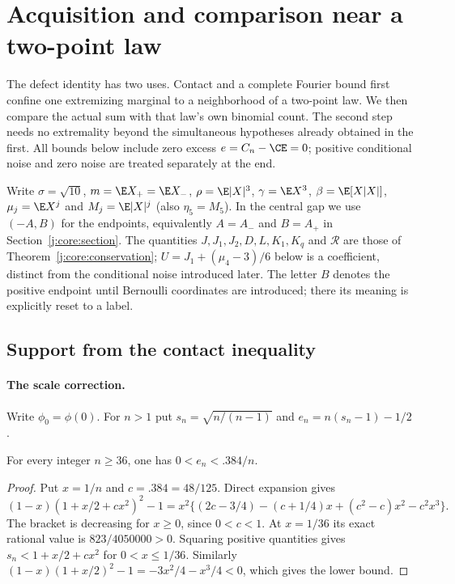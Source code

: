 \providecommand{\phio}{\phi(0)}
\providecommand{\cR}{\mathcal R}
\providecommand{\Prb}{\mathbb P}
\providecommand{\nm}{\mathrm}
\section{Acquisition and comparison near a two-point law}
\label{j:local:section}
The defect identity has two uses. Contact and a complete Fourier bound
first confine one extremizing marginal to a neighborhood of a two-point
law. We then compare the actual sum with that law's own binomial count.
The second step needs no extremality beyond the simultaneous hypotheses
already obtained in the first. All bounds below include zero excess
$e=C_n-\CE=0$; positive conditional noise and zero noise are treated
separately at the end.

Write $\sigma=\sqrt{10}$, $m=\E X_+=\E X_-$,
$\rho=\E|X|^3$, $\gamma=\E X^3$, $\beta=\E[X|X|]$,
$\mu_j=\E X^j$ and $M_j=\E|X|^j$ (also $\eta_5=M_5$).
In the central gap we use $(-A,B)$ for the endpoints, equivalently
$A=A_-$ and $B=A_+$ in Section~\ref{j:core:section}.
The quantities $J,J_1,J_2,D,L,K_1,K_q$ and $\mathcal R$ are those of
Theorem~\ref{j:core:conservation}; $U=J_1+(\mu_4-3)/6$ below is a
coefficient, distinct from the conditional noise introduced later.
The letter $B$ denotes the positive endpoint until Bernoulli coordinates
are introduced; there its meaning is explicitly reset to a label.


\subsection{Support from the contact inequality}\label{j:local:support:theorem}
\paragraph{The scale correction.}
Write $\phi_0=\phi(0)$.
For $n>1$ put $s_n=\sqrt{n/(n-1)}$ and
$e_n=n(s_n-1)-1/2$.
\begin{lemma}\label{j:local:support:scale}
For every integer $n\ge36$, one has $0<e_n<.384/n$.
\end{lemma}
\begin{proof}
Put $x=1/n$ and $c=.384=48/125$. Direct expansion gives
\[
 (1-x)(1+x/2+cx^2)^2-1
 =x^2\{(2c-3/4)-(c+1/4)x+(c^2-c)x^2-c^2x^3\}.
\]
The bracket is decreasing for $x\ge0$, since $0<c<1$.
At $x=1/36$ its exact rational value is $823/4050000>0$.
Squaring positive quantities gives
$s_n<1+x/2+cx^2$ for $0<x\le1/36$. Similarly
$(1-x)(1+x/2)^2-1=-3x^2/4-x^3/4<0$, which gives the lower bound.
\end{proof}


